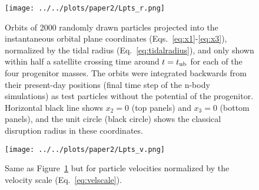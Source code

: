 \documentclass[letterpaper,12pt,preprint]{aastex}
\newcommand{\tub}{t_{\rm ub}}
\begin{document}
\begin{figure}[h]
\begin{center}
\texttt{[image: ../../plots/paper2/Lpts\_r.png]}
\caption{ Orbits of 2000 randomly drawn particles projected into the instantaneous orbital plane coordinates (Eqs.~\ref{eq:x1}-\ref{eq:x3}), normalized by the tidal radius (Eq.~\ref{eq:tidalradius}), and only shown within half a satellite crossing time around $t=\tub$ for each of the four progenitor masses. The orbits were integrated backwards from their present-day positions (final time step of the n-body simulations) as test particles without the potential of the progenitor. Horizontal black line shows $x_2=0$ (top panels) and $x_3=0$ (bottom panels), and the unit circle (black circle) shows the classical disruption radius in these coordinates. }\label{fig:lpts_r}
\end{center}
\end{figure}

\begin{figure}[h]
\begin{center}
\texttt{[image: ../../plots/paper2/Lpts\_v.png]}
\caption{ Same as Figure~\ref{fig:lpts_r} but for particle velocities normalized by the velocity scale (Eq.~\ref{eq:velscale}). }\label{fig:lpts_v}
\end{center}
\end{figure}

\end{document}
